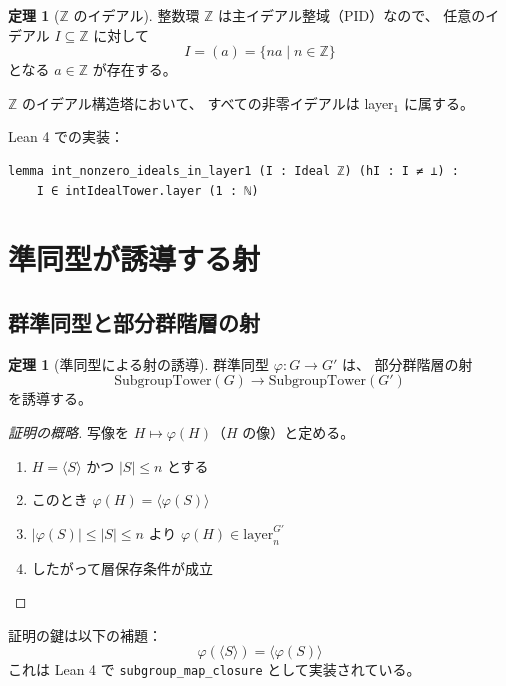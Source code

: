 \documentclass[a4paper,12pt]{ltjsarticle}
\theoremstyle{definition}
\newtheorem{theorem}[definition]{定理}
\begin{document}
\begin{theorem}[$\mathbb{Z}$ のイデアル]
整数環 $\mathbb{Z}$ は主イデアル整域（PID）なので、
任意のイデアル $I \subseteq \mathbb{Z}$ に対して
\[
I = (a) = \{na \mid n \in \mathbb{Z}\}
\]
となる $a \in \mathbb{Z}$ が存在する。
\end{theorem}

\begin{corollary}
$\mathbb{Z}$ のイデアル構造塔において、
すべての非零イデアルは layer$_1$ に属する。
\end{corollary}

Lean 4 での実装：
\begin{verbatim}
lemma int_nonzero_ideals_in_layer1 (I : Ideal ℤ) (hI : I ≠ ⊥) :
    I ∈ intIdealTower.layer (1 : ℕ)
\end{verbatim}

\section{準同型が誘導する射}

\subsection{群準同型と部分群階層の射}

\begin{theorem}[準同型による射の誘導]
群準同型 $\varphi : G \to G'$ は、
部分群階層の射
\[
\text{SubgroupTower}(G) \to \text{SubgroupTower}(G')
\]
を誘導する。
\end{theorem}

\begin{proof}[証明の概略]
写像を $H \mapsto \varphi(H)$（$H$ の像）と定める。
\begin{enumerate}
  \item $H = \langle S \rangle$ かつ $|S| \leq n$ とする
  \item このとき $\varphi(H) = \langle \varphi(S) \rangle$
  \item $|\varphi(S)| \leq |S| \leq n$ より
    $\varphi(H) \in \text{layer}_n^{G'}$
  \item したがって層保存条件が成立
\end{enumerate}
\end{proof}

\begin{keypoint}[補題の重要性]
証明の鍵は以下の補題：
\[
\varphi(\langle S \rangle) = \langle \varphi(S) \rangle
\]
これは Lean 4 で \texttt{subgroup\_map\_closure} として実装されている。
\end{keypoint}
\end{document}

